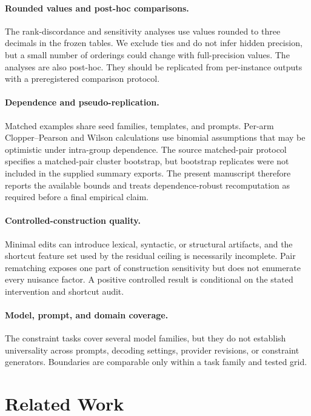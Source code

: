 \documentclass[acmsmall,screen,review,anonymous]{acmart}
\begin{document}
\paragraph{Rounded values and post-hoc comparisons.}
The rank-discordance and sensitivity analyses use values rounded to three
decimals in the frozen tables. We exclude ties and do not infer hidden
precision, but a small number of orderings could change with full-precision
values. The analyses are also post-hoc. They should be replicated from
per-instance outputs with a preregistered comparison protocol.

\paragraph{Dependence and pseudo-replication.}
Matched examples share seed families, templates, and prompts. Per-arm
Clopper--Pearson and Wilson calculations use binomial assumptions that may be
optimistic under intra-group dependence. The source matched-pair protocol specifies a
matched-pair cluster bootstrap, but bootstrap replicates were not included in
the supplied summary exports. The present manuscript therefore reports the
available bounds and treats dependence-robust recomputation as required
before a final empirical claim.

\paragraph{Controlled-construction quality.}
Minimal edits can introduce lexical, syntactic, or structural artifacts, and
the shortcut feature set used by the residual ceiling is necessarily
incomplete. Pair rematching exposes one part of construction sensitivity but
does not enumerate every nuisance factor. A positive controlled result is
conditional on the stated intervention and shortcut audit.

\paragraph{Model, prompt, and domain coverage.}
The constraint tasks cover several model families, but they do not establish
universality across prompts, decoding settings, provider revisions, or
constraint generators. Boundaries are comparable only within a task family
and tested grid.


\section{Related Work}
\label{sec:related-work}
\end{document}

